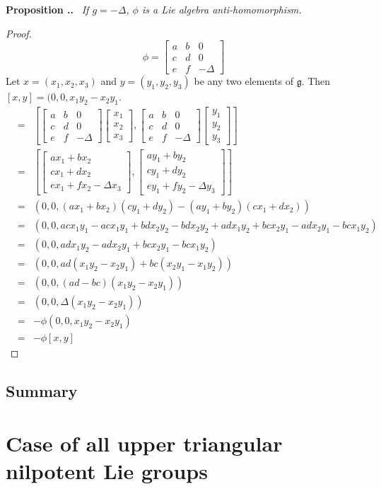 \documentclass[honours]{UNSWthesis}
\newcommand{\g}{\mathfrak{g}}
\newcommand{\1}{\mathbf{e}_{1}}
\newcommand{\2}{\mathbf{e}_{3}}
\newcommand{\3}{\mathbf{e}_{3}}
\newcounter{Item}[section]
\newenvironment{Proposition}{\medskip
                            \refstepcounter{Item}
                            \noindent
                           {\bf Proposition \thesection.\theItem.}\ %
                            \begingroup \sl}
                           {\endgroup\medskip}
\begin{document}
\begin{Proposition}
If $g=-\Delta$, $\phi$ is a Lie algebra anti-homomorphism.
\end{Proposition}

\begin{proof}
\[
\phi = 
\begin{bmatrix}
a & b & 0 \\
c & d & 0 \\
e & f & -\Delta
\end{bmatrix}
\]
Let $x=(x_{1},x_{2},x_{3})$ and $y=(y_{1},y_{2},y_{3})$ be any two elements of $\g$. Then $[x,y]=(0,0,x_{1}y_{2}-x_{2}y_{1}$. 
\begin{eqnarray*}
[\phi(x),\phi(y)] &=& \left[
\begin{bmatrix}
a & b & 0 \\
c & d & 0 \\
e & f & -\Delta
\end{bmatrix} 
\begin{bmatrix}
x_{1} \\ x_{2} \\ x_{3}
\end{bmatrix}
,
\begin{bmatrix}
a & b & 0 \\
c & d & 0 \\
e & f & -\Delta
\end{bmatrix} 
\begin{bmatrix}
y_{1} \\ y_{2} \\ y_{3}
\end{bmatrix}
\right] \\
&=& \left[
\begin{bmatrix}
ax_{1}+bx_{2} \\ cx_{1}+dx_{2} \\ ex_{1}+fx_{2} - \Delta x_{3}
\end{bmatrix}
,
\begin{bmatrix}
ay_{1}+by_{2} \\ cy_{1}+dy_{2} \\ ey_{1}+fy_{2} - \Delta y_{3}
\end{bmatrix}
\right] \\
&=& (0,0,(ax_{1}+bx_{2})(cy_{1}+dy_{2})-(ay_{1}+by_{2})(cx_{1}+dx_{2})) \\
&=& (0,0,acx_{1}y_{1} - acx_{1}y_{1} + bdx_{2}y_{2} - bdx_{2}y_{2} + adx_{1}y_{2} + bcx_{2}y_{1} -adx_{2}y_{1} -bcx_{1}y_{2} ) \\
&=& (0,0, adx_{1}y_{2}  -adx_{2}y_{1}+ bcx_{2}y_{1} -bcx_{1}y_{2} ) \\
&=& (0,0,ad(x_{1}y_{2}  -x_{2}y_{1})+ bc(x_{2}y_{1} -x_{1}y_{2})) \\
&=& (0,0,(ad-bc)(x_{1}y_{2}  -x_{2}y_{1})) \\
&=& (0,0,\Delta(x_{1}y_{2}-x_{2}y_{1})) \\
&=& -\phi(0,0,x_{1}y_{2}-x_{2}y_{1}) \\
&=& -\phi[x,y] 
\end{eqnarray*}
\end{proof}


\section{Summary}


\chapter{Case of all upper triangular nilpotent Lie groups}
\end{document}
